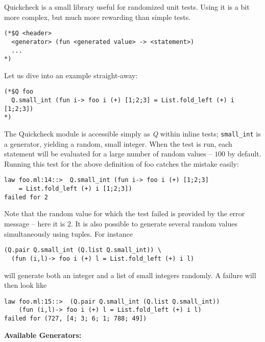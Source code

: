 
Quickcheck is a small library useful for randomized unit tests. Using it is a bit more
complex, but much more rewarding than simple tests.

\begin{verbatim}
(*$Q <header>
  <generator> (fun <generated value> -> <statement>)
  ...
*)
\end{verbatim}

Let us dive into an example straight-away:

\begin{verbatim}
(*$Q foo
  Q.small_int (fun i-> foo i (+) [1;2;3] = List.fold_left (+) i [1;2;3])
*)
\end{verbatim}

The Quickcheck module is accessible simply as \emph{Q} within inline tests; \texttt{small\_int} is a
generator, yielding a random, small integer. When the test is run, each statement will be
evaluated for a large number of random values -- $100$ by default. Running this test for the
above definition of foo catches the mistake easily:

{\Oconsole\begin{verbatim}
law foo.ml:14::>  Q.small_int (fun i-> foo i (+) [1;2;3]
    = List.fold_left (+) i [1;2;3])
failed for 2
\end{verbatim} }

Note that the random value for which the test failed is provided by the error message --
here it is 2. It is also possible to generate several random values simultaneously using
tuples. For instance


\begin{verbatim}
(Q.pair Q.small_int (Q.list Q.small_int)) \
  (fun (i,l)-> foo i (+) l = List.fold_left (+) i l)
\end{verbatim}

will generate both an integer and a list of small integers randomly. A failure will then
look like

{\Oconsole\begin{verbatim}
law foo.ml:15::>  (Q.pair Q.small_int (Q.list Q.small_int))
    (fun (i,l)-> foo i (+) l = List.fold_left (+) i l)
failed for (727, [4; 3; 6; 1; 788; 49])
\end{verbatim}}

\textbf{Available Generators:}

